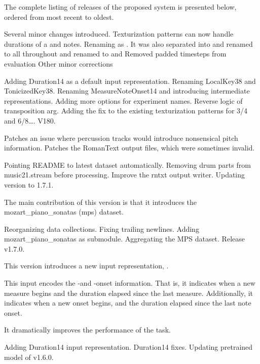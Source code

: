 The complete listing of releases of the proposed system is
presented below, ordered from most recent to oldest.

Several minor changes introduced. Texturization patterns can
now handle durations of a  and
 notes. Renaming  as
. It was also separated into
 and  
renamed to  all throughout
 and  renamed to
 and  Removed padded
timesteps from evaluation Other minor corrections

Adding Duration14 as a default input representation.
Renaming LocalKey38 and TonicizedKey38. Renaming
MeasureNoteOnset14 and introducing intermediate
representations. Adding more options for experiment names.
Reverse logic of transposition arg. Adding the fix to the
existing texturization patterns for 3/4 and 6/8…. V180.

Patches an issue where percussion tracks would introduce
nonsensical pitch information. Patches the RomanText output
files, which were sometimes invalid.

Pointing README to latest dataset automatically. Removing
drum parts from music21.stream before processing. Improve
the rntxt output writer. Updating version to 1.7.1.

The main contribution of this version is that it introduces
the mozart\_piano\_sonatas (mps) dataset.

Reorganizing data collections. Fixing trailing newlines.
Adding mozart\_piano\_sonatas as submodule. Aggregating the
MPS dataset. Release v1.7.0.

This version introduces a new input representation,
.

This input encodes the -and -onset
information. That is, it indicates when a new measure begins
and the duration elapsed since the last measure.
Additionally, it indicates when a new onset begins, and the
duration elapsed since the last note onset.

It dramatically improves the performance of the
 task.


Adding Duration14 input representation. Duration14 fixes.
Updating pretrained model of v1.6.0.

